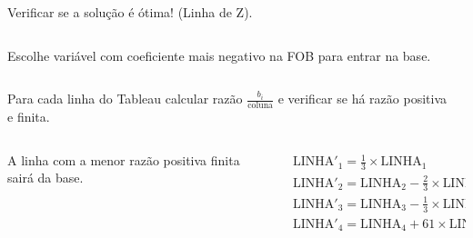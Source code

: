 \begin{frame}
{\begin{columns}
\begin{column}{5cm}
			\end{column}
		\end{columns}
	}	
	{
		\begin{columns}
			\begin{column}{5cm}
				\begin{mdframed}[backgroundcolor=olive!80]
					Verificar se a solução é ótima! (Linha de Z).
				\end{mdframed}
			\end{column}
			\begin{column}{5cm}

			\end{column}
		\end{columns}
	}	
	\only<3>
	{
		\begin{columns}
			\begin{column}{5cm}
				\begin{mdframed}[backgroundcolor=orange!80]
					Escolhe variável com coeficiente mais negativo na FOB para entrar na base.
				\end{mdframed}
			\end{column}
			\begin{column}{5cm}

			\end{column}
		\end{columns}
	}	
	\only<4>
	{
		\begin{columns}
			\begin{column}{5cm}
				\begin{mdframed}[backgroundcolor=olive!80]
					Para cada linha do Tableau calcular razão $\frac{b_i}{\text{coluna}}$ e verificar se há razão positiva e finita.
				\end{mdframed}
			\end{column}
			\begin{column}{5cm}

			\end{column}
		\end{columns}
	}	

	\only<5>
	{
		\begin{columns}
			\begin{column}{5cm}
				\begin{mdframed}[backgroundcolor=orange!80]
					A linha com a menor razão positiva finita sairá da base.
				\end{mdframed}
			\end{column}
			\begin{column}{5cm}
				$
					\begin{matrix}
						\scriptstyle \text{LINHA}'_1 = \frac{1}{3} \times \text{LINHA}_1 \\
						\scriptstyle \text{LINHA}'_2 = \text{LINHA}_2 - \frac{2}{3} \times \text{LINHA}_1 \\
						\scriptstyle \text{LINHA}'_3 = \text{LINHA}_3 - \frac{1}{3} \times \text{LINHA}_1 \\
						\scriptstyle \text{LINHA}'_4 = \text{LINHA}_4 + 61 \times \text{LINHA}_1 \\
					\end{matrix}
				$
			\end{column}
		\end{columns}
	}	



\end{frame}
